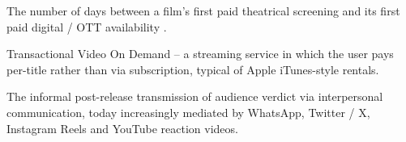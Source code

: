 \begin{description}[style=nextline,leftmargin=2.4em]
\item[Theatrical window.]  The number of days between a film's
        first paid theatrical screening and its first paid digital /
        OTT availability \citep{vogel2020}.

\item[TVOD.]  Transactional Video On Demand -- a streaming service
        in which the user pays per-title rather than via
        subscription, typical of Apple iTunes-style rentals.

\item[Word-of-mouth (WOM).]  The informal post-release transmission
        of audience verdict via interpersonal communication, today
        increasingly mediated by WhatsApp, Twitter / X, Instagram
        Reels and YouTube reaction videos.
\end{description}
